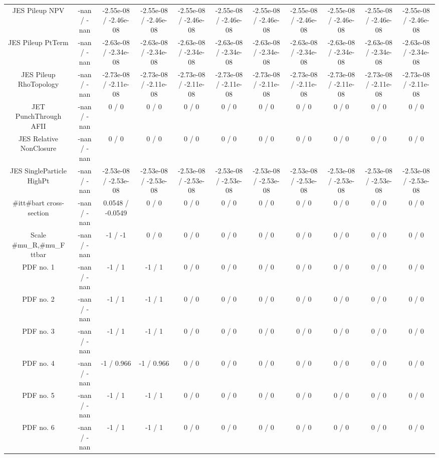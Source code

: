 \begin{table}[htbp]
\begin{center}
\begin{tabular}{|c|c|c|c|c|c|c|c|c|c|c|}
  JES Pileup NPV & -nan / -nan & -2.55e-08 / -2.46e-08 & -2.55e-08 / -2.46e-08 & -2.55e-08 / -2.46e-08 & -2.55e-08 / -2.46e-08 & -2.55e-08 / -2.46e-08 & -2.55e-08 / -2.46e-08 & -2.55e-08 / -2.46e-08 & -2.55e-08 / -2.46e-08 & -2.55e-08 / -2.46e-08 \\ 
  JES Pileup PtTerm & -nan / -nan & -2.63e-08 / -2.34e-08 & -2.63e-08 / -2.34e-08 & -2.63e-08 / -2.34e-08 & -2.63e-08 / -2.34e-08 & -2.63e-08 / -2.34e-08 & -2.63e-08 / -2.34e-08 & -2.63e-08 / -2.34e-08 & -2.63e-08 / -2.34e-08 & -2.63e-08 / -2.34e-08 \\ 
  JES Pileup RhoTopology & -nan / -nan & -2.73e-08 / -2.11e-08 & -2.73e-08 / -2.11e-08 & -2.73e-08 / -2.11e-08 & -2.73e-08 / -2.11e-08 & -2.73e-08 / -2.11e-08 & -2.73e-08 / -2.11e-08 & -2.73e-08 / -2.11e-08 & -2.73e-08 / -2.11e-08 & -2.73e-08 / -2.11e-08 \\ 
  JET PunchThrough AFII & -nan / -nan & 0 / 0 & 0 / 0 & 0 / 0 & 0 / 0 & 0 / 0 & 0 / 0 & 0 / 0 & 0 / 0 & 0 / 0 \\ 
  JES Relative NonClosure & -nan / -nan & 0 / 0 & 0 / 0 & 0 / 0 & 0 / 0 & 0 / 0 & 0 / 0 & 0 / 0 & 0 / 0 & 0 / 0 \\ 
  JES SingleParticle HighPt & -nan / -nan & -2.53e-08 / -2.53e-08 & -2.53e-08 / -2.53e-08 & -2.53e-08 / -2.53e-08 & -2.53e-08 / -2.53e-08 & -2.53e-08 / -2.53e-08 & -2.53e-08 / -2.53e-08 & -2.53e-08 / -2.53e-08 & -2.53e-08 / -2.53e-08 & -2.53e-08 / -2.53e-08 \\ 
  #it{t#bar{t}} cross-section & -nan / -nan & 0.0548 / -0.0549 & 0 / 0 & 0 / 0 & 0 / 0 & 0 / 0 & 0 / 0 & 0 / 0 & 0 / 0 & 0 / 0 \\ 
  Scale #mu_{R},#mu_{F} ttbar & -nan / -nan & -1 / -1 & 0 / 0 & 0 / 0 & 0 / 0 & 0 / 0 & 0 / 0 & 0 / 0 & 0 / 0 & 0 / 0 \\ 
  PDF no. 1 & -nan / -nan & -1 / 1 & -1 / 1 & 0 / 0 & 0 / 0 & 0 / 0 & 0 / 0 & 0 / 0 & 0 / 0 & 0 / 0 \\ 
  PDF no. 2 & -nan / -nan & -1 / 1 & -1 / 1 & 0 / 0 & 0 / 0 & 0 / 0 & 0 / 0 & 0 / 0 & 0 / 0 & 0 / 0 \\ 
  PDF no. 3 & -nan / -nan & -1 / 1 & -1 / 1 & 0 / 0 & 0 / 0 & 0 / 0 & 0 / 0 & 0 / 0 & 0 / 0 & 0 / 0 \\ 
  PDF no. 4 & -nan / -nan & -1 / 0.966 & -1 / 0.966 & 0 / 0 & 0 / 0 & 0 / 0 & 0 / 0 & 0 / 0 & 0 / 0 & 0 / 0 \\ 
  PDF no. 5 & -nan / -nan & -1 / 1 & -1 / 1 & 0 / 0 & 0 / 0 & 0 / 0 & 0 / 0 & 0 / 0 & 0 / 0 & 0 / 0 \\ 
  PDF no. 6 & -nan / -nan & -1 / 1 & -1 / 1 & 0 / 0 & 0 / 0 & 0 / 0 & 0 / 0 & 0 / 0 & 0 / 0 & 0 / 0 \\ 

\end{tabular}
\end{center}
\end{table}
